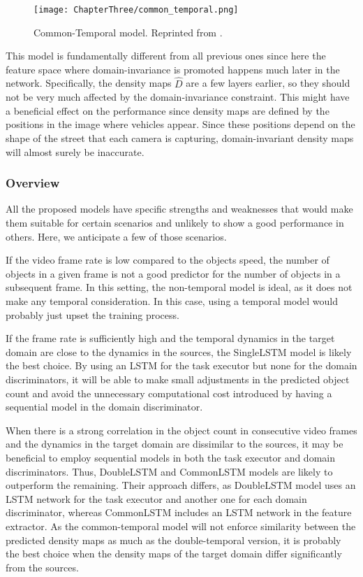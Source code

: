 \begin{figure}[!ht]
	\centering
	\texttt{[image: ChapterThree/common\_temporal.png]}
	\caption{Common-Temporal model. Reprinted from \citet{ThesisFrancisco}.}
	\label{fig:common_temporal_model}
\end{figure}

This model is fundamentally different from all previous ones since here the feature space where domain-invariance is promoted happens much later in the network. Specifically, the density maps $\widehat{D}$ are a few layers earlier, so they should not be very much affected by the domain-invariance constraint. This might have a beneficial effect on the performance since density maps are defined by the positions in the image where vehicles appear. Since these positions depend on the shape of the street that each camera is capturing, domain-invariant density maps will almost surely be inaccurate.

\subsubsection{Overview}

All the proposed models have specific strengths and weaknesses that would make them suitable for certain scenarios and unlikely to show a good performance in others. Here, we anticipate a few of those scenarios.

If the video frame rate is low compared to the objects speed, the number of objects in a given frame is not a good predictor for the number of objects in a subsequent frame. In this setting, the non-temporal model is ideal, as it does not make any temporal consideration. In this case, using a temporal model would probably just upset the training process.

If the frame rate is sufficiently high and the temporal dynamics in the target domain are close to the dynamics in the sources, the SingleLSTM model is likely the best choice. By using an LSTM for the task executor but none for the domain discriminators, it will be able to make small adjustments in the predicted object count and avoid the unnecessary computational cost introduced by having a sequential model in the domain discriminator.

When there is a strong correlation in the object count in consecutive video frames and the dynamics in the target domain are dissimilar to the sources, it may be beneficial to employ sequential models in both the task executor and domain discriminators. Thus, DoubleLSTM and CommonLSTM models are likely to outperform the remaining. Their approach differs, as DoubleLSTM model uses an LSTM network for the task executor and another one for each domain discriminator, whereas CommonLSTM includes an LSTM network in the feature extractor. As the common-temporal model will not enforce similarity between the predicted density maps as much as the double-temporal version, it is probably the best choice when the density maps of the target domain differ significantly from the sources.

